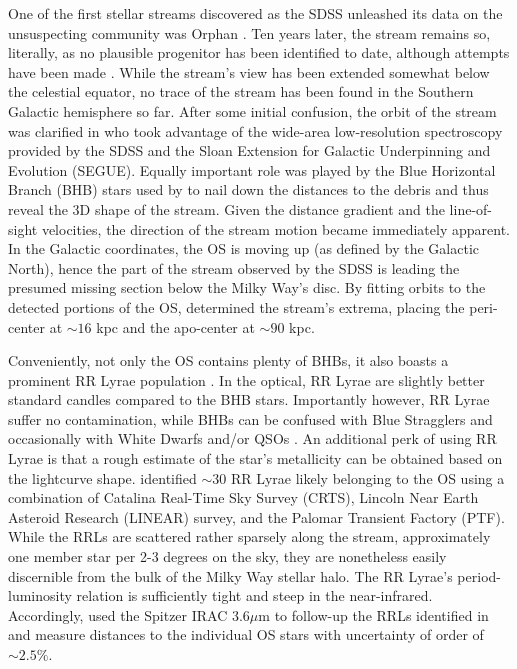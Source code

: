 \documentclass[a4paper,useAMS,usenatbib]{mnras}
\begin{document}
One of the first stellar streams discovered as the SDSS unleashed its
data on the unsuspecting community was Orphan
\citep[see][]{OS_C,OS_V}. Ten years later, the stream remains so,
literally, as no plausible progenitor has been identified to date,
although attempts have been made
\citep[e.g.][]{Fellhauer2007,Jin2007,Sales2008,Casey2013,Casey2014,Grillmair2015}. While
the stream's view has been extended somewhat below the celestial
equator, no trace of the stream has been found in the Southern
Galactic hemisphere so far. After some initial confusion, the orbit
of the stream was clarified in \citet{Newberg2010} who took advantage
of the wide-area low-resolution spectroscopy provided by the SDSS and
the Sloan Extension for Galactic Underpinning and Evolution
(SEGUE). Equally important role was played by the Blue Horizontal
Branch (BHB) stars used by \citet{Newberg2010} to nail down the
distances to the debris and thus reveal the 3D shape of the
stream. Given the distance gradient and the line-of-sight velocities,
the direction of the stream motion became immediately apparent. In the
Galactic coordinates, the OS is moving up (as defined by the Galactic
North), hence the part of the stream observed by the SDSS is leading
the presumed missing section below the Milky Way's disc. By fitting
orbits to the detected portions of the OS, \citet{Newberg2010}
determined the stream's extrema, placing the peri-center at $\sim16$
kpc and the apo-center at $\sim90$ kpc.

Conveniently, not only the OS contains plenty of BHBs, it also boasts
a prominent RR Lyrae population \cite[see e.g.][]{Sesar2013}. In the
optical, RR Lyrae are slightly better standard candles compared to the
BHB stars. Importantly however, RR Lyrae suffer no contamination,
while BHBs can be confused with Blue Stragglers and occasionally with
White Dwarfs and/or QSOs \citep[see e.g.][]{Deason2014}. An additional
perk of using RR Lyrae is that a rough estimate of the star's
metallicity can be obtained based on the lightcurve
shape. \citet{Sesar2013} identified $\sim30$ RR Lyrae likely belonging
to the OS using a combination of Catalina Real-Time Sky Survey (CRTS),
Lincoln Near Earth Asteroid Research (LINEAR) survey, and the Palomar
Transient Factory (PTF). While the RRLs are scattered rather sparsely
along the stream, approximately one member star per 2-3 degrees on the
sky, they are nonetheless easily discernible from the bulk of the
Milky Way stellar halo. The RR Lyrae's period-luminosity relation is
sufficiently tight and steep in the near-infrared. Accordingly,
\citet{Hendel2018} used the Spitzer IRAC 3.6$\mu$m to follow-up the
RRLs identified in \citet{Sesar2013} and measure distances to the
individual OS stars with uncertainty of order of $\sim2.5\%$.
\end{document}
